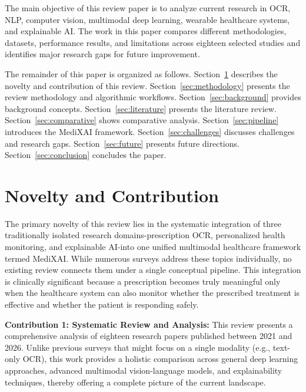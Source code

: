 \documentclass[conference]{IEEEtran}
\begin{document}
The main objective of this review paper is to analyze current research in OCR, NLP, computer vision, multimodal deep learning, wearable healthcare systems, and explainable AI. The work in this paper compares different methodologies, datasets, performance results, and limitations across eighteen selected studies and identifies major research gaps for future improvement.

The remainder of this paper is organized as follows. Section~\ref{sec:Novelty} describes the novelty and contribution of this review. Section~\ref{sec:methodology} presents the review methodology and algorithmic workflows. Section~\ref{sec:background} provides background concepts. Section~\ref{sec:literature} presents the literature review. Section~\ref{sec:comparative} shows comparative analysis. Section~\ref{sec:pipeline} introduces the MediXAI framework. Section~\ref{sec:challenges} discusses challenges and research gaps. Section~\ref{sec:future} presents future directions. Section~\ref{sec:conclusion} concludes the paper.







\section{Novelty and Contribution}
\label{sec:Novelty}

The primary novelty of this review lies in the systematic integration of three traditionally isolated research domains-prescription OCR, personalized health monitoring, and explainable AI-into one unified multimodal healthcare framework termed MediXAI. While numerous surveys address these topics individually, no existing review connects them under a single conceptual pipeline. This integration is clinically significant because a prescription becomes truly meaningful only when the healthcare system can also monitor whether the prescribed treatment is effective and whether the patient is responding safely.

\textbf{Contribution 1: Systematic Review and Analysis:}
This review presents a comprehensive analysis of eighteen research papers published between 2021 and 2026. Unlike previous surveys that might focus on a single modality (e.g., text-only OCR), this work provides a holistic comparison across general deep learning approaches, advanced multimodal vision-language models, and explainability techniques, thereby offering a complete picture of the current landscape.
\end{document}

